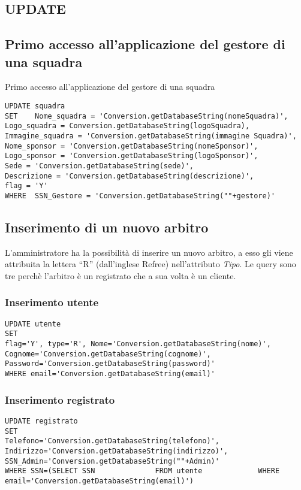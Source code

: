 \subsection{UPDATE}

\subsection*{Primo accesso all'applicazione del gestore di una squadra}
Primo accesso all'applicazione del gestore di una squadra

\begin{lstlisting}
UPDATE squadra
SET    Nome_squadra = 'Conversion.getDatabaseString(nomeSquadra)',
Logo_squadra = Conversion.getDatabaseString(logoSquadra),
Immagine_squadra = 'Conversion.getDatabaseString(immagine Squadra)',
Nome_sponsor = 'Conversion.getDatabaseString(nomeSponsor)',
Logo_sponsor = 'Conversion.getDatabaseString(logoSponsor)',
Sede = 'Conversion.getDatabaseString(sede)',
Descrizione = 'Conversion.getDatabaseString(descrizione)',
flag = 'Y'
WHERE  SSN_Gestore = 'Conversion.getDatabaseString(""+gestore)'
\end{lstlisting}

\subsection*{Inserimento di un nuovo arbitro}
L'amministratore ha la possibilità di inserire un nuovo arbitro, a esso gli viene attribuita la lettera ``R'' (dall'inglese Refree) nell'attributo \emph{Tipo}. Le query sono tre perchè l'arbitro è un registrato che a sua volta è un cliente.

\subsubsection*{Inserimento utente}

\begin{lstlisting}
UPDATE utente
SET 
flag='Y', type='R', Nome='Conversion.getDatabaseString(nome)', Cognome='Conversion.getDatabaseString(cognome)',
Password='Conversion.getDatabaseString(password)'
WHERE email='Conversion.getDatabaseString(email)'
\end{lstlisting}

\subsubsection*{Inserimento registrato}

\begin{lstlisting}
UPDATE registrato
SET 
Telefono='Conversion.getDatabaseString(telefono)', Indirizzo='Conversion.getDatabaseString(indirizzo)',
SSN_Admin='Conversion.getDatabaseString(""+Admin)'
WHERE SSN=(SELECT SSN              FROM utente             WHERE email='Conversion.getDatabaseString(email)')
\end{lstlisting}

